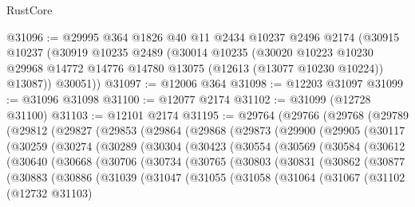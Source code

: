 \begin{lexlean}{RustCore}
\begin{coremodule}
@31096 := @29995
    @364
    @1826
    @40
    @11
    @2434
    @10237
    @2496
    @2174
    (@30915
      @10237
      (@30919
        @10235
        @2489
        (@30014
          @10235
          (@30020
            @10223
            @10230
            @29968
            @14772
            @14776
            @14780
            @13075
            (@12613 (@13077 @10230 @10224))
            @13087))
        @30051))
@31097 := @12006 @364
@31098 := @12203 @31097
@31099 := @31096 @31098
@31100 := @12077 @2174
@31102 := @31099 (@12728 @31100)
@31103 := @12101 @2174
@31195 := @29764
    (@29766
      (@29768
        (@29789
          (@29812
            (@29827
              (@29853
                (@29864
                  (@29868
                    (@29873
                      (@29900
                        (@29905
                          (@30117
                            (@30259
                              (@30274
                                (@30289
                                  (@30304
                                    (@30423
                                      (@30554
                                        (@30569
                                          (@30584
                                            (@30612
                                              (@30640
                                                (@30668
                                                  (@30706
                                                    (@30734
                                                      (@30765
                                                        (@30803
                                                          (@30831
                                                            (@30862
                                                              (@30877
                                                                (@30883
                                                                  (@30886
                                                                    (@31039
                                                                      (@31047
                                                                        (@31055
                                                                          (@31058
                                                                            (@31064
                                                                              (@31067
                                                                                (@31102
                                                                                  (@12732 @31103)

\end{coremodule}
\end{lexlean}

